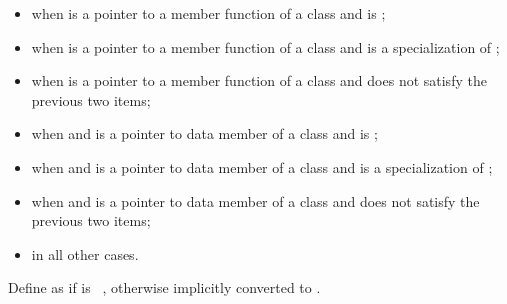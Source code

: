 \begin{itemize}
\item {} when  is a pointer to a
member function of a class 
and  is ;

\item {} when  is a pointer to a
member function of a class 
and  is a specialization of ;

\item {} when  is a pointer to a
member function of a class 
and  does not satisfy the previous two items;

\item {} when  and  is a pointer to
data member of a class 
and  is ;

\item {} when  and  is a pointer to
data member of a class 
and  is a specialization of ;

\item {} when  and  is a pointer to
data member of a class 
and  does not satisfy the previous two items;

\item {} in all other cases.
\end{itemize}

\pnum
{}%
Define  as
if  is \cv{}~, otherwise
 implicitly converted
to .

